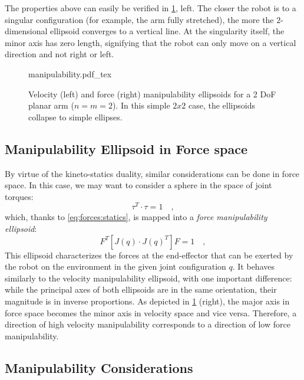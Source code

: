 The properties above can easily be verified in \cref{fig:manipulability}, left. The closer the robot is to a singular configuration (for example, the arm fully stretched), the more the $2$-dimensional ellipsoid converges to a vertical line. At the singularity itself, the minor axis has zero length, signifying that the robot can only move on a vertical direction and not right or left.

\begin{figure}
    \centering
     \def\svgwidth{0.9\textwidth}
    {manipulability.pdf_tex}
    \caption{Velocity (left) and force (right) manipulability ellipsoids for a 2 DoF planar arm ($n=m=2$). In this simple $2x2$ case, the ellipsoids collapse to simple ellipses. }\label{fig:manipulability}
\end{figure}

\subsection{Manipulability Ellipsoid in Force space}

By virtue of the kineto-statics duality, similar considerations can be done in force space. In this case, we may want to consider a sphere in the space of joint torques:
\begin{equation}
\tau^T\cdot\tau = 1 \quad ,  \label{eq:forces:manipulability:torquesphere}
\end{equation}
which, thanks to \cref{eq:forces:statics}, is mapped into a \textsl{force manipulability ellipsoid}:
\begin{equation}
F^T \left[ J(q) \cdot J(q)^T \right] F = 1 \quad ,
\label{eq:forces:manipulability:forcemanipulability}
\end{equation}
This ellipsoid characterizes the forces at the end-effector that can be exerted by the robot on the environment in the given joint configuration $q$. It behaves similarly to the velocity manipulability ellipsoid, with one important difference: while the principal axes of both ellipsoids are in the same orientation, their magnitude is in inverse proportions.
As depicted in \cref{fig:manipulability} (right), the major axis in force space becomes the minor axis in velocity space and vice versa.
Therefore, a direction of high velocity manipulability corresponds to a direction of low force manipulability.

\subsection{Manipulability Considerations}

